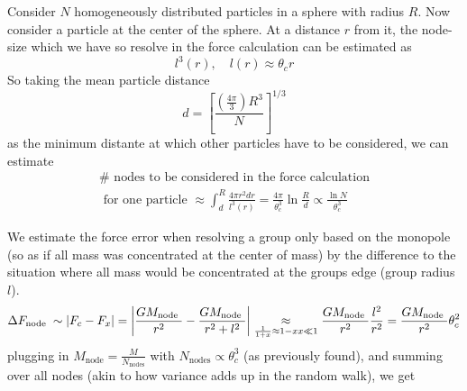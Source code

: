 Consider $N$ homogeneously distributed particles in a sphere with radius $R$.
Now consider a particle at the center of the sphere. At a distance $r$ from
it, the node-size which we have so resolve in the force calculation can be estimated as
\begin{equation}
    l^3(r), \quad l(r) \approx \theta_c r
\end{equation}
So taking the mean particle distance
\begin{equation}
    d=\left[\frac{\left(\frac{4 \pi}{3}\right) R^3}{N}\right]^{1 / 3}
\end{equation}
as the minimum distante at which other particles have to be considered, we can estimate
\begin{equation}
    \begin{gathered}
        \# \text{ nodes to be considered in the force calculation} \\ \text{ for one particle } \approx \int_d^R \frac{4 \pi r^2 d r}{l^3(r)}=\frac{4 \pi}{\theta_c^3} \ln \frac{R}{d} \propto \frac{\ln N}{\theta_c^3}
    \end{gathered}
\end{equation}


We estimate the force error when resolving a group only based on the monopole
(so as if all mass was concentrated at the center of mass) by the difference
to the situation where all mass would be concentrated at the groups edge
(group radius $l$).
\begin{equation}
    \Delta F_{\text {node }} \sim\left|F_c-F_x\right|=\left|\frac{G M_{\text {node }}}{r^2}-\frac{G M_{\text {node }}}{r^2+l^2}\right| \underset{\frac{1}{1+x} \approx 1-x \\ x \ll 1}{\approx} \frac{G M_{\text {node }}}{r^2} \frac{l^2}{r^2}=\frac{G M_{\text {node }}}{r^2} \theta_c^2
\end{equation}
plugging in $M_\text{node} = \frac{M}{N_\text{nodes}}$ with $N_\text{nodes} \propto \theta^3_c$ (as previously found),
and summing over all nodes (akin to how variance adds up in the random walk), we get

